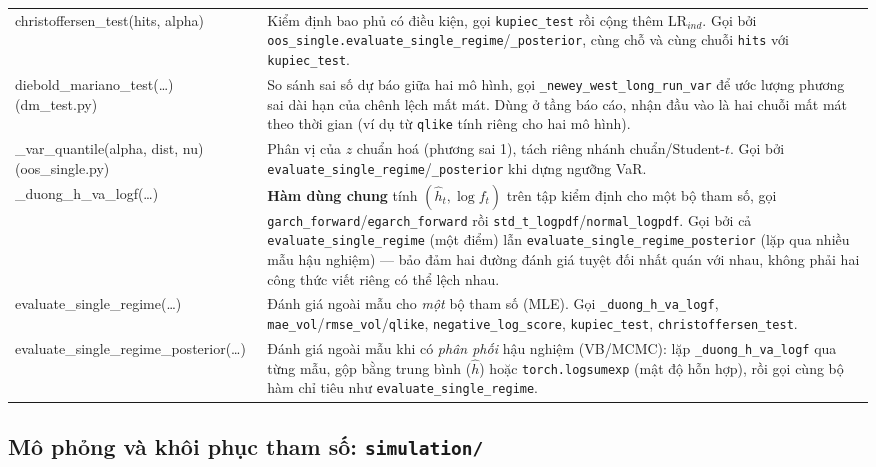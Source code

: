 \documentclass[11pt,a4paper]{article}
\newcommand{\code}[1]{\texttt{#1}}
\newcommand{\file}[1]{\texttt{#1}}
\begin{document}
\begin{longtable}{@{}>{\ttfamily\scriptsize\raggedright\arraybackslash}p{5.0cm} >{\raggedright\arraybackslash}p{9.5cm}@{}}
christoffersen\_test(hits, alpha) & Kiểm định bao phủ có điều kiện, gọi \code{kupiec\_test} rồi cộng thêm $\mathrm{LR}_{ind}$. Gọi bởi \code{oos\_single.evaluate\_single\_regime}/\code{\_posterior}, cùng chỗ và cùng chuỗi \code{hits} với \code{kupiec\_test}. \\
diebold\_mariano\_test(\ldots) \newline \footnotesize{(dm\_test.py)} & So sánh sai số dự báo giữa hai mô hình, gọi \code{\_newey\_west\_long\_run\_var} để ước lượng phương sai dài hạn của chênh lệch mất mát. Dùng ở tầng báo cáo, nhận đầu vào là hai chuỗi mất mát theo thời gian (ví dụ từ \code{qlike} tính riêng cho hai mô hình). \\
\_var\_quantile(alpha, dist, nu) \newline \footnotesize{(oos\_single.py)} & Phân vị của $z$ chuẩn hoá (phương sai 1), tách riêng nhánh chuẩn/Student-$t$. Gọi bởi \code{evaluate\_single\_regime}/\code{\_posterior} khi dựng ngưỡng VaR. \\
\_duong\_h\_va\_logf(\ldots) & \textbf{Hàm dùng chung} tính $(\hat h_t,\log f_t)$ trên tập kiểm định cho một bộ tham số, gọi \code{garch\_forward}/\code{egarch\_forward} rồi \code{std\_t\_logpdf}/\code{normal\_logpdf}. Gọi bởi cả \code{evaluate\_single\_regime} (một điểm) lẫn \code{evaluate\_single\_regime\_posterior} (lặp qua nhiều mẫu hậu nghiệm) --- bảo đảm hai đường đánh giá tuyệt đối nhất quán với nhau, không phải hai công thức viết riêng có thể lệch nhau. \\
evaluate\_single\_regime(\ldots) & Đánh giá ngoài mẫu cho \emph{một} bộ tham số (MLE). Gọi \code{\_duong\_h\_va\_logf}, \code{mae\_vol}/\code{rmse\_vol}/\code{qlike}, \code{negative\_log\_score}, \code{kupiec\_test}, \code{christoffersen\_test}. \\
evaluate\_single\_regime\_posterior(\ldots) & Đánh giá ngoài mẫu khi có \emph{phân phối} hậu nghiệm (VB/MCMC): lặp \code{\_duong\_h\_va\_logf} qua từng mẫu, gộp bằng trung bình ($\hat h$) hoặc \code{torch.logsumexp} (mật độ hỗn hợp), rồi gọi cùng bộ hàm chỉ tiêu như \code{evaluate\_single\_regime}. \\
\end{longtable}

\subsection{Mô phỏng và khôi phục tham số: \file{simulation/}}
\end{document}

